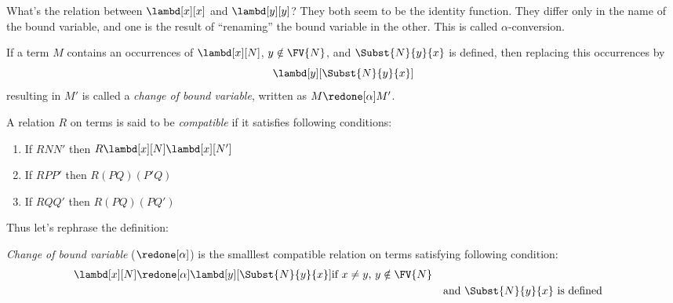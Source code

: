 \documentclass[../../../include/open-logic-section]{subfiles}
\begin{document}

What's the relation between $\lambd[x][x]$ and $\lambd[y][y]$? They
both seem to be the identity function. They differ only in the name of
the bound variable, and one is the result of ``renaming'' the bound
variable in the other. This is called $\alpha$-conversion.

\begin{defn}
  If a term $M$ contains an occurrences of $\lambd[x][N]$, $y \notin
  \FV{N}$, and $\Subst{N}{y}{x}$ is defined, then replacing this occurrences
  by 
  \begin{equation*}
    \lambd[y][\Subst{N}{y}{x}]
  \end{equation*}
  resulting in $M'$ is called a \emph{change of bound variable}, written
  as $M \redone[\alpha] M'$.
\end{defn}

\begin{defn}
  A relation $R$ on terms is said to be \emph{compatible}
  if it satisfies following conditions:
  \begin{enumerate}
  \item If $R N N'$ then $R \lambd[x][N] \lambd[x][N']$
  \item If $R P P'$ then $R (PQ) (P'Q)$
  \item If $R Q Q'$ then $R (PQ) (PQ')$
  \end{enumerate}
\end{defn}

Thus let's rephrase the definition:
\begin{defn}
  \emph{Change of bound variable} ($\redone[\alpha]$) is 
  the smalllest compatible relation on terms satisfying following
  condition:
  \begin{align*}
    &\lambd[x][N] \redone[\alpha] \lambd[y][\Subst{N}{y}{x}] \text{if
      $x \neq y$, $y \notin \FV{N}$} \\
    & &&\text{and $\Subst{N}{y}{x}$ is defined}
  \end{align*}
\end{defn}
\end{document}
